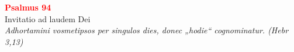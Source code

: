 


\def\greinitialformat#1{%
{\fontsize{39}{39}\selectfont #1}%
}




\vspace{0.3cm}
\begin{center}
 \textcolor{red}{\large \bf Psalmus 94}\\
Invitatio ad laudem Dei\\
\textit{\small Adhortamini vosmetipsos per singulos dies, donec „hodie“ cognominatur. (Hebr 3,13)}
\end{center}
